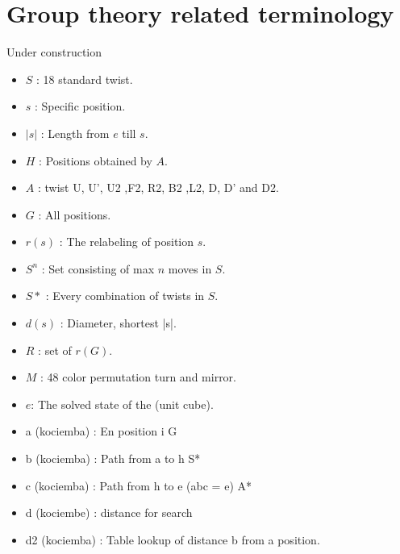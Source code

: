 \section{Group theory related terminology}
\huge{Under construction}
\begin{itemize}
\item $S$ : 18 standard twist.
\item $s$ : Specific position.
\item $|s|$ : Length from $e$ till $s$.
\item $H$ : Positions obtained by $A$.
\item $A$ : twist U, U', U2 ,F2, R2, B2 ,L2, D, D' and D2.
\item $G$ : All positions. 
\item $r(s)$ : The relabeling of position $s$.
\item $S^{n}$ : Set consisting of max $n$ moves in $S$.
\item $S*$ : Every combination of twists in $S$.
\item $d(s)$ : Diameter, shortest |s|.
\item $R$ : set of $r(G)$.
\item $M$ : 48 color permutation turn and mirror.
\item $e$: The solved state of the \rubik{}(unit cube).

\item a (kociemba) : En position i G
\item b (kociemba) : Path from a to h S*
\item c (kociemba) : Path from h to e (abc = e) A*
\item d (kociembe) : distance for search
\item d2 (kociemba) : Table lookup of distance b from a position.

\end{itemize}




